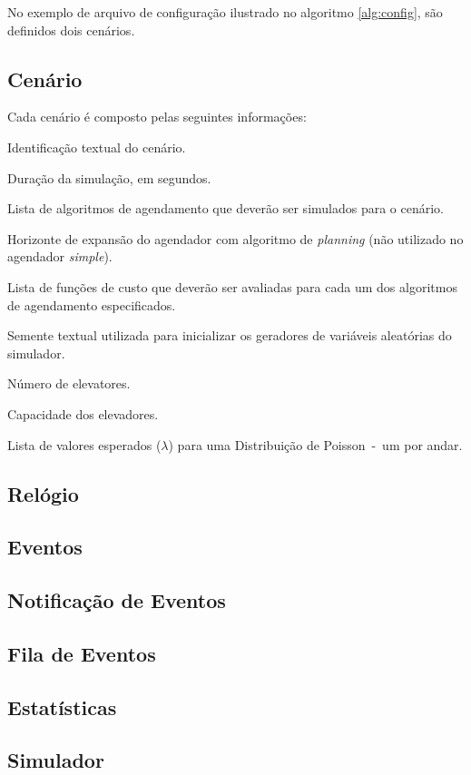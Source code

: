 No exemplo de arquivo de configuração ilustrado no algoritmo \ref{alg:config},
são definidos dois cenários.

\subsection{\label{simulator:model:scenario}Cenário}

Cada cenário é composto pelas seguintes informações:

\begin{description}[leftmargin=!,labelwidth=\widthof{\bfseries Função de Custo}]
  \item[Nome] Identificação textual do cenário.
  \item[Duração] Duração da simulação, em segundos.
  \item[Agendador] Lista de algoritmos de agendamento que deverão ser simulados para o cenário.
  \item[Horizonte] Horizonte de expansão do agendador com algoritmo de \textit{planning} (não utilizado no agendador \textit{simple}).
  \item[Função de Custo] Lista de funções de custo que deverão ser avaliadas para cada um dos algoritmos de agendamento especificados.
  \item[Semente] Semente textual utilizada para inicializar os geradores de variáveis aleatórias do simulador.
  \item[Elevadores] Número de elevatores.
  \item[Capacidade] Capacidade dos elevadores.
  \item[Andares] Lista de valores esperados ($\lambda$) para uma Distribuição de Poisson~-~um por andar.
\end{description}

\subsection{\label{simulator:model:clock}Relógio}
\lipsum[1]

\subsection{\label{simulator:model:events}Eventos}
\lipsum[1]

\subsection{\label{simulator:model:notification}Notificação de Eventos}
\lipsum[1]

\subsection{\label{simulator:model:queue}Fila de Eventos}
\lipsum[1]

\subsection{\label{simulator:model:statistics}Estatísticas}
\lipsum[1]

\subsection{\label{simulator:model:simulator}Simulador}
\lipsum[1]
